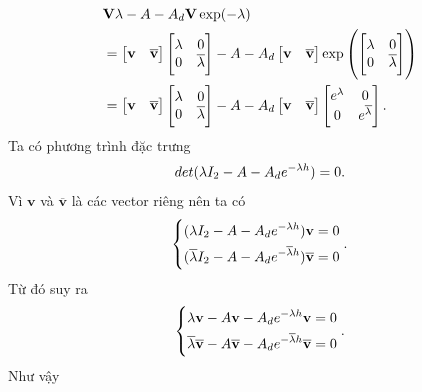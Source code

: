 \begin{align}\label{100}
	&\mathbf{V} \mathbf{\lambda} - A - A_d \mathbf{V} \exp (-\mathbf{\lambda})\\ \notag
	&= 
	\begin{bmatrix}
		\mathbf{v}&\mathbf{\overline{v}}
	\end{bmatrix}
	\begin{bmatrix}
		\lambda & 0 \\ 0 & \overline{\lambda}
	\end{bmatrix}
	- A - A_d \begin{bmatrix}
		\mathbf{v}&\mathbf{\overline{v}}
	\end{bmatrix} \exp \left(\begin{bmatrix}
		\lambda & 0 \\ 0 & \overline{\lambda}
	\end{bmatrix}\right)\\ \notag
	&= \begin{bmatrix}
		\mathbf{v}&\mathbf{\overline{v}}
	\end{bmatrix}
	\begin{bmatrix}
		\lambda & 0 \\ 0 & \overline{\lambda}
	\end{bmatrix}
	- A - A_d \begin{bmatrix}
		\mathbf{v}&\mathbf{\overline{v}}
	\end{bmatrix} \begin{bmatrix}
		e^{\lambda} & 0 \\ 0 & e^{\overline{\lambda}}
	\end{bmatrix}.
\end{align} 
Ta có phương trình đặc trưng
\begin{equation*}
	det(\lambda I_2 -A - A_de^{-\lambda h }) = 0 .
\end{equation*}
Vì $\mathbf{v}$ và  $\mathbf{\overline{v}}$ là các vector riêng nên ta có
\begin{equation*}
	\left\{\begin{aligned}
		&(\lambda I_2 -A - A_de^{-\lambda h })\mathbf{v} =0\\
		&(\overline{\lambda} I_2 -A - A_de^{-\overline{\lambda} h }) \mathbf{\overline{v}} =0\end{aligned}\right. .
\end{equation*}
Từ đó suy ra
\begin{equation*}
	\left\{\begin{aligned}
		&\lambda \mathbf{v} -A\mathbf{v} - A_de^{-\lambda h }\mathbf{v} =0\\
		&\overline{\lambda}\mathbf{\overline{v}} -A\mathbf{\overline{v}} - A_de^{-\overline{\lambda} h }\mathbf{\overline{v}} =0\end{aligned}\right. .
\end{equation*}
Như vậy
